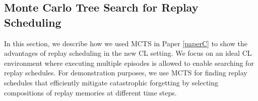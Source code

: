 


\subsection{Monte Carlo Tree Search for Replay Scheduling}

In this section, we describe how we used MCTS in Paper \ref{paperC} to show the advantages of replay scheduling in the new CL setting. We focus on an ideal CL environment where executing multiple episodes is allowed to enable searching for replay schedules. For demonstration purposes, we use MCTS for finding replay schedules that efficiently mitigate catastrophic forgetting by selecting compositions of replay memories at different time steps. 

